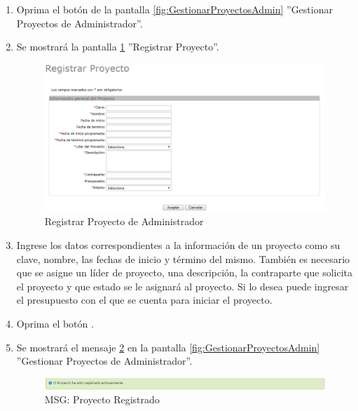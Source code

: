			\begin{enumerate}
	
			\item Oprima el botón \IURegistrar{} de la pantalla \ref{fig:GestionarProyectosAdmin} ''Gestionar Proyectos de Administrador''.
			
			\item Se mostrará la pantalla \ref{fig:registrarProyecto} ''Registrar Proyecto''.

			\begin{figure}[htbp!]
				\begin{center}
					\includegraphics[scale=0.6]{roles/administrador/proyectosAdmin/gestionarproyectosAdmin/pantallas/IU2-1registrarProyecto}
					\caption{Registrar Proyecto de Administrador}
					\label{fig:registrarProyecto}
				\end{center}
			\end{figure}
		
			\item Ingrese los datos correspondientes a la información  de un proyecto como su clave, nombre, las fechas de inicio y término del mismo. También es necesario que se asigne un líder de proyecto, una descripción, la contraparte que solicita el proyecto y que estado se le asignará al proyecto. Si lo desea puede ingresar el presupuesto con el que se cuenta para iniciar el proyecto.
			
			\item Oprima el botón \IUAceptar.
			
			\item Se mostrará el mensaje \ref{fig:proyectoRegistrado} en la pantalla \ref{fig:GestionarProyectosAdmin} ''Gestionar Proyectos de Administrador''.
			
			\begin{figure}[htbp!]
				\begin{center}
					\includegraphics[scale=0.6]{roles/administrador/proyectosAdmin/gestionarproyectosAdmin/pantallas/IU2-1MSG1}
					\caption{MSG: Proyecto Registrado}
					\label{fig:proyectoRegistrado}
				\end{center}
			\end{figure}
			\end{enumerate}